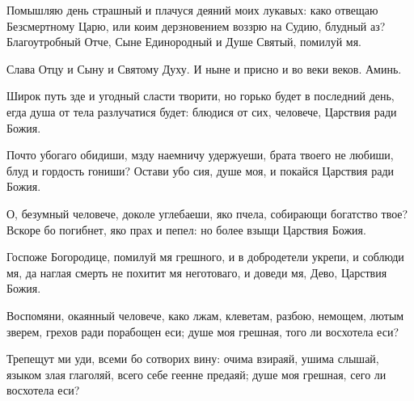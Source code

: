 \begin{mymulticols}

Помышляю день страшный и плачуся деяний моих лукавых: како отвещаю Безсмертному Царю, или коим дерзновением воззрю на Судию, блудный аз? Благоутробный Отче, Сыне Единородный и Душе Святый, помилуй мя.

Слава Отцу и Сыну и Святому Духу. И ныне и присно и во веки веков. Аминь.





Широк путь зде и угодный сласти творити, но горько будет в последний день, егда душа от тела разлучатися будет: блюдися от сих, человече, Царствия ради Божия.


Почто убогаго обидиши, мзду наемничу удержуеши, брата твоего не любиши, блуд и гордость гониши? Остави убо сия, душе моя, и покайся Царствия ради Божия.

\slava

О, безумный человече, доколе углебаеши, яко пчела, собирающи богатство твое? Вскоре бо погибнет, яко прах и пепел: но более взыщи Царствия Божия.

\inyne

Госпоже Богородице, помилуй мя грешного, и в добродетели укрепи, и соблюди мя, да наглая смерть не похитит мя неготоваго, и доведи мя, Дево, Царствия Божия.




Воспомяни, окаянный человече, како лжам, клеветам, разбою, немощем, лютым зверем, грехов ради порабощен еси; душе моя грешная, того ли восхотела еси?


Трепещут ми уди, всеми бо сотворих вину: очима взираяй, ушима слышай, языком злая глаголяй, всего себе геенне предаяй; душе моя грешная, сего ли восхотела еси?


\end{mymulticols}
